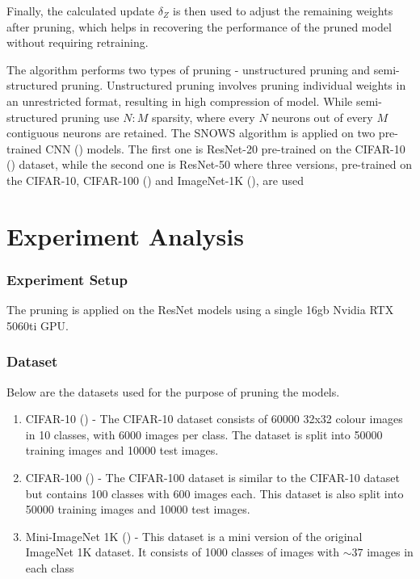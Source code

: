 \documentclass[11pt]{extreport}
\begin{document}
		Finally, the calculated update $\delta_Z$ is then used to adjust the remaining weights after pruning, which helps in recovering the performance of the pruned model without requiring retraining. 

		The algorithm performs two types of pruning - unstructured pruning and semi-structured pruning. Unstructured pruning involves pruning individual weights in an unrestricted format, resulting in high compression of model. While semi-structured pruning use \(N:M\) sparsity, where every \(N\) neurons out of every \(M\) contiguous neurons are retained. The SNOWS algorithm is applied on two pre-trained CNN (\cite{lecun1998gradient}) models. The first one is ResNet-20 pre-trained on the CIFAR-10 (\cite{cifar}) dataset, while the second one is ResNet-50 where three versions, pre-trained on the CIFAR-10, CIFAR-100 (\cite{cifar}) and ImageNet-1K (\cite{data_01}), are used
		

	\newpage
	\chapter[Experiment Analysis]{Experiment Analysis}

		\subsection[Experiment Setup]{Experiment Setup}
		The pruning is applied on the ResNet models using a single 16gb Nvidia RTX 5060ti GPU. 

		\subsection[Dataset]{Dataset}

		Below are the datasets used for the purpose of pruning the models.
		
		\begin{enumerate}
			\item CIFAR-10 (\cite{cifar}) - The CIFAR-10 dataset consists of 60000 32x32 colour images in 10 classes, with 6000 images per class. The dataset is split into 50000 training images and 10000 test images.
			\item CIFAR-100 ({\cite{cifar}}) - The CIFAR-100 dataset is similar to the CIFAR-10 dataset but contains 100 classes with 600 images each. This dataset is also split into 50000 training images and 10000 test images.
			\item Mini-ImageNet 1K (\cite{data_01}) - This dataset is a mini version of the original ImageNet 1K dataset. It consists of 1000 classes of images with \(\sim37\) images in each class
		\end{enumerate}
\end{document}

